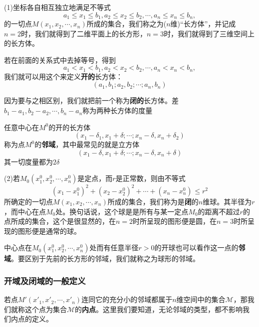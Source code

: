 \documentclass[lang=cn,10pt]{elegantbook}
\begin{document}
(1)坐标各自相互独立地满足不等式
\begin{equation*}
	a_{1}\le x_{1}\le b_{1},a_{2}\le x_{2}\le b_{2},\cdots,a_{n}\le x_{n}\le b_{n},
\end{equation*}
的一切点$M(x_{1},x_{2},\cdots,x_{n})$所成的集合，我们称之为($n$维)“长方体”，并记成
\begin{equation*}
	[a_{1},b_{1};a_{2},b_{2};\cdots;a_{n},b_{n}]
\end{equation*}
$n=2$时，我们就得到了二维平面上的长方形，$n=3$时，我们就得到了三维空间上的长方体。

若在前面的关系式中去掉等号，得到
\begin{equation*}
		a_{1}< x_{1}< b_{1},a_{2}< x_{2}< b_{2},\cdots,a_{n}< x_{n}< b_{n},
\end{equation*}
我们就可以用这个来定义\textbf{开的}长方体：
\begin{equation*}
	(a_{1},b_{1};a_{2},b_{2};\cdots;a_{n},b_{n})
\end{equation*}

因为要与之相区别，我们就把前一个称为\textbf{闭的}长方体。差$b_{1}-a_{1},b_{2}-a_{2},\cdots,b_{n}-a_{n}$称为两种长方体的度量

任意中心在$M^{0}$的开的长方体
\begin{equation*}
	(x_{1}-\delta_{1},x_{1}+\delta;\cdots;x_{n}-\delta,x_{n}+\delta_{2})
\end{equation*}
称为点$M^{0}$的\textbf{邻域}，其中最常见的就是立方体
\begin{equation*}
	(x_{1}-\delta,x_{1}+\delta;\cdots;x_{n}-\delta,x_{n}+\delta)
\end{equation*}
其一切度量都为$2\delta$

(2)若$M_{0}(x^{0}_{1},x^{0}_{2},\cdots,x^{0}_{n})$是定点，而$r$是正常数，则由不等式
\begin{equation*}
	(x_{1}-x_{1}^{0})^{2}+(x_{2}-x_{2}^{0})^{2}+\cdots+(x_{n}-x_{n}^{0})^{}\le r^{2}
\end{equation*}
所确定的一切点$M(x_{1},x_{2},\cdots,x_{n})$所成的集合，我们称为是\textbf{闭}的$n$维球。其半径为$r$，而中心在点$M_{0}$处。换句话说，这个球是是所有与某一定点$M_{0}$的距离不超过$r$的点所成的集合，这个是很显然的，在$n=2$时所呈现的图形便是圆，在$n=3$时所呈现的图形便是通常的球。

中心点在$M_{0}(x^{0}_{1},x^{0}_{2},\cdots,x^{0}_{n})$处而有任意半径$r>0$的开球也可以看作这一点的\textbf{邻域}。要区别于先前的长方形的邻域，我们就称之为球形的邻域。
\subsubsection{开域及闭域的一般定义}
若点$M'(x'_{1},x'_{2},\cdots,x'_{n})$连同它的充分小的邻域都属于$n$维空间中的集合$\mathcal{M}$，那我们就称这个点为集合$\mathcal{M}$的\textbf{内点}。这里我们要知道，无论邻域的类型，都不影响我们内点的定义。
\end{document}
